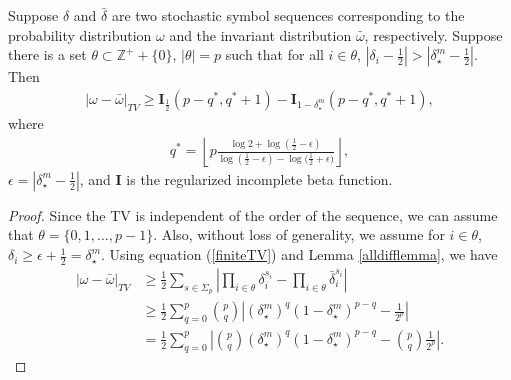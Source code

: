 \begin{theorem}
\label{theoremlb} Suppose $\delta$ and $\bar{\delta}$ are two stochastic symbol sequences corresponding
to the probability distribution $\omega$ and the invariant distribution $\bar{\omega}$,
respectively. Suppose there is a set $\theta \subset \mathbb{Z}^++\{0\} $, $|\theta|=p$ such that
for all $i \in \theta$, $|\delta_i-\frac{1}{2}|>|\delta^m_\star-\frac{1}{2}|$. Then
\begin{eqnarray}
\label{lbineq}
|\omega-\bar{\omega}|_{TV} \ge \mathbf{I}_{\frac{1}{2}}(p-q^*,q^*+1) - \mathbf{I}_{1-\delta^m_\star}(p-q^*,q^*+1),
\end{eqnarray}
where
\begin{eqnarray}
\label{kstar}
q^* =  \left\lfloor p \frac{\log{2}+\log{(\frac{1}{2}-\epsilon)} }{\log{(\frac{1}{2}-\epsilon)}-\log{(\frac{1}{2}+\epsilon})} \right\rfloor,
\end{eqnarray}
$\epsilon = |\delta^m_\star-\frac{1}{2}|$, and $\mathbf{I}$ is the regularized incomplete
beta function.
\end{theorem}
\begin{proof}
Since the TV is independent of the order of the sequence, we can assume that
$\theta=\{0,1,\ldots,p-1\}$. Also, without loss of generality, we assume for $i\in \theta$,
$\delta_i \ge \epsilon+\frac{1}{2}= \delta^m_\star$. Using equation (\ref{finiteTV}) and Lemma
\ref{alldifflemma}, we have
\begin{align}
\label{lbtv}
|\omega-\bar{\omega}|_{TV}
                      &\ge \frac{1}{2} \sum_{s\in\Sigma_p}
                             \left| \prod_{i\in \theta}\delta_i^{s_i}-\prod_{i\in\theta}\bar{\delta}_i^{s_i}  \right| \nonumber\\
                      &\ge \frac{1}{2}  \sum_{q=0}^{p}
                             {p \choose q} \left|(\delta^m_\star)^q (1-\delta^m_\star)^{p-q} - \frac{1}{2^p} \right| \nonumber \\
                      &=   \frac{1}{2}  \sum_{q=0}^{p} \left|{p \choose q} (\delta^m_\star)^q (1-\delta^m_\star)^{p-q} -{p \choose q} \frac{1}{2^p} \right|.
\end{align}
\end{proof}


